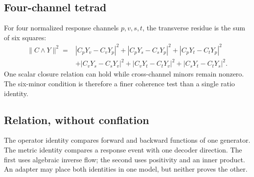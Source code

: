 \subsection{Four-channel tetrad}

For four normalized response channels $p,v,s,t$, the transverse residue is the sum of six squares:
\[
\begin{aligned}
\|C\wedge Y\|^2={}&|C_pY_v-C_vY_p|^2+|C_pY_s-C_sY_p|^2
+|C_pY_t-C_tY_p|^2\\
&+|C_vY_s-C_sY_v|^2+|C_vY_t-C_tY_v|^2
+|C_sY_t-C_tY_s|^2.
\end{aligned}
\]
One scalar closure relation can hold while cross-channel minors remain nonzero. The six-minor condition is therefore a finer coherence test than a single ratio identity.

\subsection{Relation, without conflation}

The operator identity compares forward and backward functions of one generator. The metric identity compares a response event with one decoder direction. The first uses algebraic inverse flow; the second uses positivity and an inner product. An adapter may place both identities in one model, but neither proves the other.
